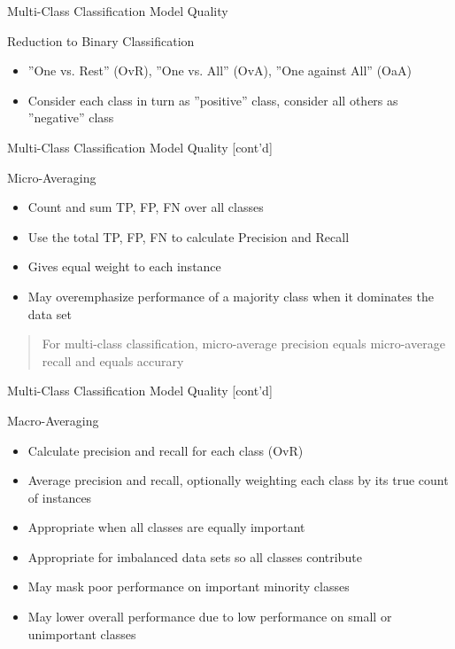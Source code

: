 \documentclass[ignorenonframetext,xcolor=x11names]{beamer}
\begin{document}
\begin{frame}[label=full]{Multi-Class Classification Model Quality}
\begin{block}{Reduction to Binary Classification}
\begin{itemize}
  \item ''One vs. Rest'' (OvR), ''One vs. All'' (OvA), ''One against All'' (OaA)
  \item Consider each class in turn as ''positive'' class, consider all others as ''negative'' class
\end{itemize}
\end{block}
\end{frame}

\begin{frame}[label=full]{Multi-Class Classification Model Quality \small [cont'd]}
\begin{block}{Micro-Averaging}
\begin{itemize} 
  \item Count and sum TP, FP, FN over all classes
  \item Use the total TP, FP, FN to calculate Precision and Recall
\end{itemize}
\end{block}

\begin{itemize}
  \item Gives equal weight to each instance
  \item May overemphasize performance of a majority class when it dominates the data set
\end{itemize}

\begin{quote} \large
For multi-class classification, micro-average precision equals micro-average recall and equals accurary
\end{quote}
\end{frame}

\begin{frame}[label=full]{Multi-Class Classification Model Quality \small [cont'd]}
\begin{block}{Macro-Averaging}
\begin{itemize} 
  \item Calculate precision and recall for each class (OvR)
  \item Average precision and recall, optionally weighting each class by its true count of instances
\end{itemize}
\end{block}

\begin{itemize}
   \item Appropriate when all classes are equally important
   \item Appropriate for imbalanced data sets so all classes contribute
   \item May mask poor performance on important minority classes
   \item May lower overall performance due to low performance on small or unimportant classes
\end{itemize}
\end{frame}
\end{document}
